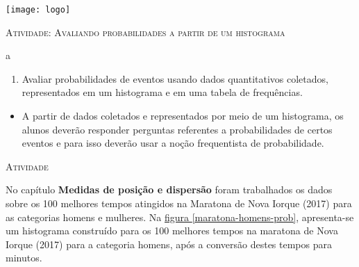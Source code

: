 \documentclass[10 pt,usenames,dvipsnames, oneside]{article}
\begin{document}
\begin{center}
  \begin{minipage}[l]{3cm}
\texttt{[image: logo]}    
\end{minipage}\hfill
\begin{minipage}[r]{.8\textwidth}
 {\Large \scshape Atividade: Avaliando probabilidades a partir de um histograma}  
\end{minipage}
\end{center}
\vspace{.2cm}

\ifdefined\prof
\begin{objetivos}
\item a
\end{objetivos}

\begin{goals}
\begin{enumerate}
\item Avaliar probabilidades de eventos usando dados quantitativos coletados, representados em um histograma e em uma tabela de frequências.
\end{enumerate}

\tcblower

\begin{itemize}
\item A partir de dados coletados e representados por meio de um histograma, os alunos deverão responder perguntas referentes a probabilidades de certos eventos e para isso deverão usar a noção frequentista de probabilidade.
\end{itemize}
\end{goals}

\bigskip
\begin{center}
{\large \scshape Atividade}
\end{center}
\fi

No capítulo \textbf{Medidas de posição e dispersão} foram trabalhados os dados sobre os 100 melhores tempos atingidos na Maratona de Nova Iorque (2017) para as categorias homens e mulheres. Na \hyperref[maratona-homens-prob]{figura \ref{maratona-homens-prob}}, apresenta-se um histograma construído para os 100 melhores tempos na maratona de Nova Iorque (2017) para a categoria homens, após a conversão destes tempos para minutos.
\end{document}
